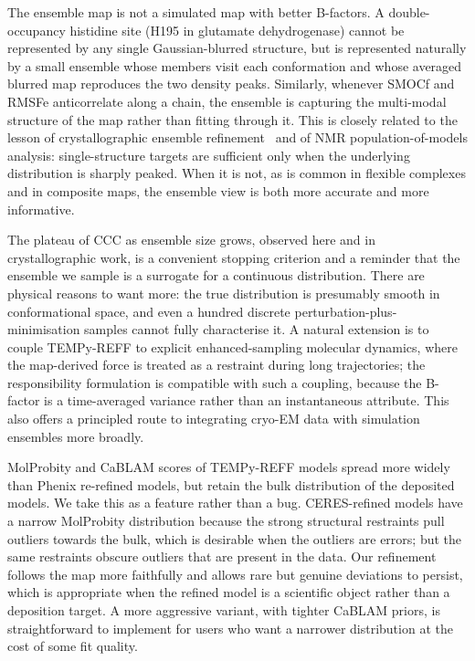 \documentclass[11pt]{article}
\begin{document}
The ensemble map is not a simulated map with better B-factors. A double-occupancy histidine site (H195 in glutamate dehydrogenase) cannot be represented by any single Gaussian-blurred structure, but is represented naturally by a small ensemble whose members visit each conformation and whose averaged blurred map reproduces the two density peaks. Similarly, whenever SMOCf and RMSFe anticorrelate along a chain, the ensemble is capturing the multi-modal structure of the map rather than fitting through it. This is closely related to the lesson of crystallographic ensemble refinement~\cite{burnley2012,levin2007} and of NMR population-of-models analysis: single-structure targets are sufficient only when the underlying distribution is sharply peaked. When it is not, as is common in flexible complexes and in composite maps, the ensemble view is both more accurate and more informative.

The plateau of CCC as ensemble size grows, observed here and in crystallographic work, is a convenient stopping criterion and a reminder that the ensemble we sample is a surrogate for a continuous distribution. There are physical reasons to want more: the true distribution is presumably smooth in conformational space, and even a hundred discrete perturbation-plus-minimisation samples cannot fully characterise it. A natural extension is to couple TEMPy-REFF to explicit enhanced-sampling molecular dynamics, where the map-derived force is treated as a restraint during long trajectories; the responsibility formulation is compatible with such a coupling, because the B-factor is a time-averaged variance rather than an instantaneous attribute. This also offers a principled route to integrating cryo-EM data with simulation ensembles more broadly.

MolProbity and CaBLAM scores of TEMPy-REFF models spread more widely than Phenix re-refined models, but retain the bulk distribution of the deposited models. We take this as a feature rather than a bug. CERES-refined models have a narrow MolProbity distribution because the strong structural restraints pull outliers towards the bulk, which is desirable when the outliers are errors; but the same restraints obscure outliers that are present in the data. Our refinement follows the map more faithfully and allows rare but genuine deviations to persist, which is appropriate when the refined model is a scientific object rather than a deposition target. A more aggressive variant, with tighter CaBLAM priors, is straightforward to implement for users who want a narrower distribution at the cost of some fit quality.
\end{document}
